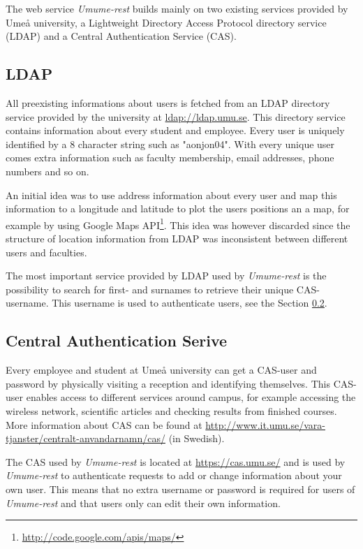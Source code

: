 \documentclass[titlepage, twocolumn, a4paper, 10pt]{article}
\begin{document}
The web service \textit{Umume-rest} builds mainly on two existing
services provided by Umeå university, a Lightweight Directory Access
Protocol directory service (LDAP) and a Central Authentication Service
(CAS).

\subsection{LDAP}\label{sec:ldap}
All preexisting informations about users is fetched from an LDAP
directory service provided by the university at
\url{ldap://ldap.umu.se}. This directory service contains information
about every student and employee. Every user is uniquely identified by
a 8 character string such as "aonjon04". With every unique user comes
extra information such as faculty membership, email addresses, phone
numbers and so on.

An initial idea was to use address information about every user and
map this information to a longitude and latitude to plot the users
positions an a map, for example by using Google Maps
API\footnote{\url{http://code.google.com/apis/maps/}}. This idea was
however discarded since the structure of location information from
LDAP was inconsistent between different users and faculties.

The most important service provided by LDAP used by
\textit{Umume-rest} is the possibility to search for first- and
surnames to retrieve their unique CAS-username. This username is used
to authenticate users, see the Section \ref{sec:cas}.

\subsection{Central Authentication Serive}\label{sec:cas}
Every employee and student at Umeå university can get a CAS-user and
password by physically visiting a reception and identifying
themselves. This CAS-user enables access to different services around
campus, for example accessing the wireless network, scientific
articles and checking results from finished courses. More information
about CAS can be found at
\url{http://www.it.umu.se/vara-tjanster/centralt-anvandarnamn/cas/}
(in Swedish).

The CAS used by \textit{Umume-rest} is located at
\url{https://cas.umu.se/} and is used by \textit{Umume-rest} to
authenticate requests to add or change information about your own
user. This means that no extra username or password is required for
users of \textit{Umume-rest} and that users only can edit their own
information.
\end{document}
